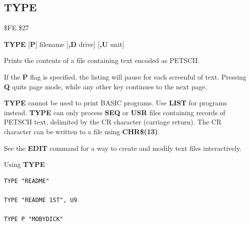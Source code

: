 \subsection{TYPE}
\begin{description}[leftmargin=2cm,style=nextline]
\item [Token:]    \$FE \$27

\item [Format:]   {\bf TYPE} [{\bf P}] filename [{\bf,D} drive] [{\bf,U} unit]

\item [Usage:]    Prints the contents of a file containing text encoded as PETSCII.

                  If the {\bf P} flag is specified, the listing will pause for each screenful of text. Pressing {\bf Q} quits page mode, while any other key continues to the next page.

                  \filenamedefinition

                  \drivedefinition

                  \unitdefinition

\item [Remarks:]  {\bf TYPE} cannot be used to print BASIC programs. Use {\bf LIST} for programs instead. {\bf TYPE} can only process {\bf SEQ} or {\bf USR} files containing records of PETSCII text, delimited by the CR character (carriage return). The CR character can be written to a file using {\bf CHR\$(13)}.

                  See the {\bf EDIT} command for a way to create and modify text files interactively.

\item [Examples:] Using {\bf TYPE}

\begin{tcolorbox}[colback=black,coltext=white]
\verbatimfont{\codefont}
\begin{verbatim}
TYPE "README"

TYPE "README 1ST", U9

TYPE P "MOBYDICK"
\end{verbatim}
\end{tcolorbox}
\end{description}


\newpage
